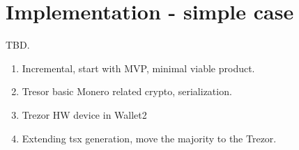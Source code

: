 \documentclass[]{article}
\begin{document}
\section{Implementation - simple case}

TBD. 

\begin{enumerate}
	\item Incremental, start with MVP, minimal viable product.
	\item Tresor basic Monero related crypto, serialization.
	\item Trezor HW device in Wallet2
	\item Extending tsx generation, move the majority to the Trezor.
	
\end{enumerate}





{}

	
\end{document}
